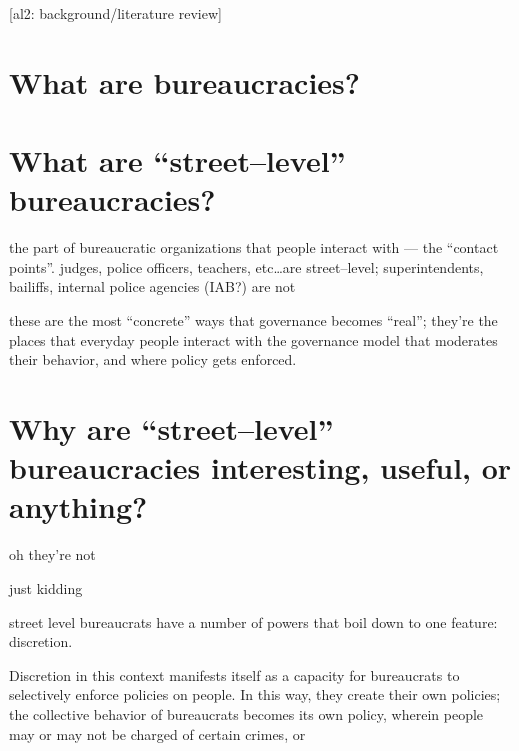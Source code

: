 \documentclass[10pt]{article}
\newcommand{\ali}[1]{{\color{Red}[al2: #1]}}
\begin{document}
\ali{background/literature review}

\section*{What are bureaucracies?}


\section*{What are ``street--level'' bureaucracies?}
the part of bureaucratic organizations that people interact with --- the ``contact points''.
judges, police officers, teachers, etc\dots are street--level; superintendents, bailiffs, internal police agencies (IAB?) are not

these are the most ``concrete'' ways that governance becomes ``real''; they're the places that everyday people interact with the governance model that moderates their behavior, and where policy gets enforced.

\section*{Why are ``street--level'' bureaucracies interesting, useful, or anything?}

oh they're not

just kidding


street level bureaucrats have a number of powers that boil down to one feature: discretion.

Discretion in this context manifests itself as a capacity for bureaucrats to selectively enforce policies on people.
In this way, they create their own policies; the collective behavior of bureaucrats becomes its own policy,
wherein people may or may not be charged of certain crimes, or 






\end{document}
